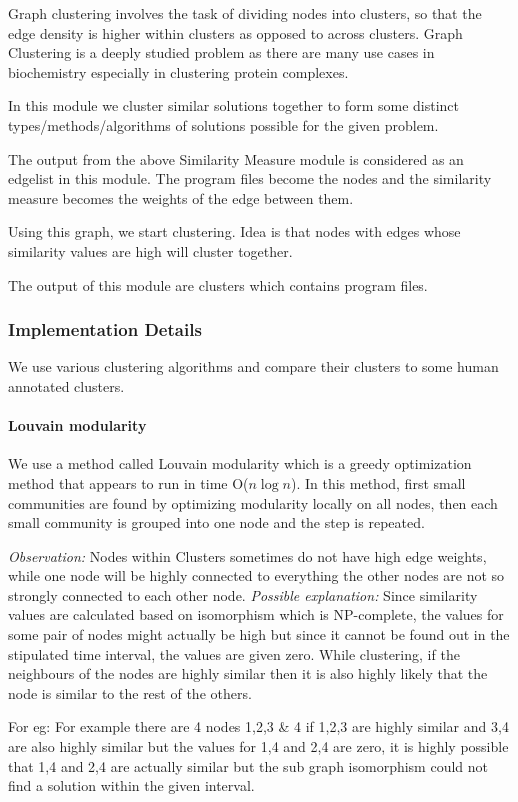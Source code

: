 Graph clustering involves the task of dividing nodes into clusters, so that the edge density is higher within clusters as opposed to across clusters. Graph Clustering is a deeply studied problem as there are many use cases in biochemistry especially in clustering protein complexes. 

In this module we cluster similar solutions together to form some distinct types/methods/algorithms of solutions possible for the given problem.

The output from the above Similarity Measure module is considered as an edgelist in this module. The program files become the nodes and the similarity measure becomes the weights of the edge between them.

Using this graph, we start clustering. Idea is that nodes with edges whose similarity values are high will cluster together. 

The output of this module are clusters which contains program files.

\subsubsection{Implementation Details}
We use various clustering algorithms and compare their clusters to some human annotated clusters.
\paragraph{Louvain modularity}
    We use a method called Louvain modularity \cite{louvian} which is a greedy optimization method that appears to run in time O($n\log n$). In this method, first small communities are found by optimizing modularity locally on all nodes, then each small community is grouped into one node and the step is repeated.

    \textit{Observation:} Nodes within Clusters sometimes do not have high edge weights, while one node will be highly connected to everything the other nodes are not so strongly connected to each other node. 
    \textit{Possible explanation:} Since similarity values are calculated based on isomorphism which is NP-complete, the values for some pair of nodes might actually be high but since it cannot be found out in the stipulated time interval, the values are given zero. While clustering, if the neighbours of the nodes are highly similar then it is also highly likely that the node is similar to the rest of the others.
    
    For eg:
            For example there are 4 nodes 1,2,3 \& 4 if 1,2,3 are highly similar and 3,4 are also highly similar but the values for 1,4 and 2,4 are zero, it is highly possible that 1,4 and 2,4 are actually similar but the sub graph isomorphism could not find a solution within the given interval.
    

